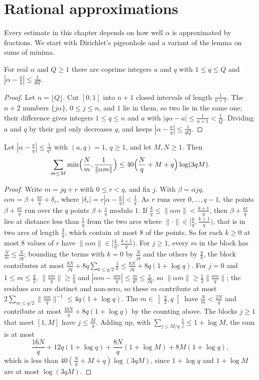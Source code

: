 \section{Rational approximations}

Every estimate in this chapter depends on how well $\alpha$ is approximated by fractions. We start with Dirichlet's pigeonhole and a variant of the lemma on sums of minima.

\begin{lemma}[Dirichlet]\label{lem:dirichlet}
For real $\alpha$ and $Q\ge1$ there are coprime integers $a$ and $q$ with $1\le q\le Q$ and $|\alpha-\frac aq|\le\frac1{qQ}$.
\end{lemma}
\begin{proof}
Let $n=\lfloor Q\rfloor$. Cut $[0,1]$ into $n+1$ closed intervals of length $\frac1{n+1}$. The $n+2$ numbers $\{j\alpha\}$, $0\le j\le n$, and $1$ lie in them, so two lie in the same one; their difference gives integers $1\le q\le n$ and $a$ with $|q\alpha-a|\le\frac1{n+1}<\frac1Q$. Dividing $a$ and $q$ by their gcd only decreases $q$, and keeps $|\alpha-\frac aq|\le\frac1{qQ}$.
\end{proof}

\begin{lemma}\label{lem:summin2}
Let $|\alpha-\frac aq|\le\frac1{q^2}$ with $(a,q)=1$, $q\ge1$, and let $M,N\ge1$. Then
\[
\sum_{m\le M}\min\Bigl(\frac Nm,\frac1{\|\alpha m\|}\Bigr)\le40\Bigl(\frac Nq+M+q\Bigr)\log(3qM).
\]
\end{lemma}
\begin{proof}
Write $m=jq+r$ with $0\le r<q$, and fix $j$. With $\beta=\alpha jq$, $\alpha m=\beta+\frac{ar}q+\delta_r$, where $|\delta_r|=r|\alpha-\frac aq|<\frac1q$. As $r$ runs over $0,\dots,q-1$, the points $\beta+\frac{ar}q$ run over the $q$ points $\beta+\frac sq$ modulo $1$. If $\frac kq\le\|\alpha m\|<\frac{k+1}q$, then $\beta+\frac{ar}q$ lies at distance less than $\frac1q$ from the two arcs where $\|\cdot\|\in[\frac kq,\frac{k+1}q)$, that is in two arcs of length $\frac3q$, which contain at most $8$ of the points. So for each $k\ge0$ at most $8$ values of $r$ have $\|\alpha m\|\in[\frac kq,\frac{k+1}q)$.
For $j\ge1$, every $m$ in the block has $\frac Nm\le\frac N{jq}$; bounding the terms with $k=0$ by $\frac N{jq}$ and the others by $\frac qk$, the block contributes at most $\frac{8N}{jq}+8q\sum_{k\le q/2}\frac1k\le\frac{8N}{jq}+8q(1+\log q)$.
For $j=0$ and $1\le m\le\frac q2$, $\|\frac{am}q\|\ge\frac1q$ and $|\alpha m-\frac{am}q|\le\frac m{q^2}\le\frac1{2q}$, so $\|\alpha m\|\ge\frac12\|\frac{am}q\|$; the residues $am$ are distinct and non-zero, so these $m$ contribute at most $2\sum_{m\le q/2}\|\frac{am}q\|^{-1}\le4q(1+\log q)$. The $m\in\left]\frac q2,q\right[$ have $\frac Nm<\frac{2N}q$ and contribute at most $\frac{16N}q+8q(1+\log q)$ by the counting above.
The blocks $j\ge1$ that meet $[1,M]$ have $j\le\frac Mq$. Adding up, with $\sum_{j\le M/q}\frac1j\le1+\log M$, the sum is at most
\[
\frac{16N}q+12q(1+\log q)+\frac{8N}q(1+\log M)+8M(1+\log q),
\]
which is less than $40(\frac Nq+M+q)\log(3qM)$, since $1+\log q$ and $1+\log M$ are at most $\log(3qM)$.
\end{proof}

